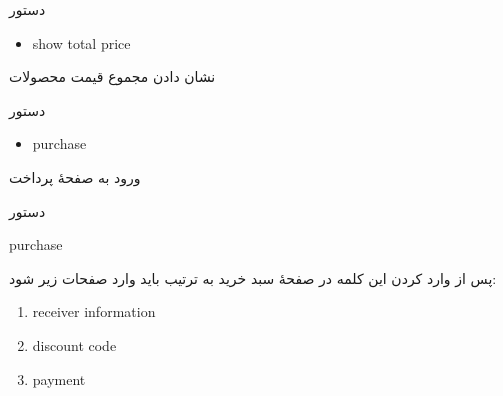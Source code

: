 \documentclass[]{article}
\begin{document}
\begin{mybox}[colback=brilliantlavender]{دستور}

\begin{latin}

\begin{itemize}[label = {$\Rightarrow$}]

\item
show total price

\end{itemize}

\end{latin}

\end{mybox}

نشان دادن مجموع قیمت محصولات


\begin{mybox}[colback=brilliantlavender]{دستور}

\begin{latin}

\begin{itemize}[label = {$\Rightarrow$}]

\item
purchase

\end{itemize}

\end{latin}

\end{mybox}

ورود به صفحهٔ پرداخت

\hrulefill

\begin{mybox}[colback=yellow]{دستور}

\begin{latin}

purchase

\end{latin}

\end{mybox}

پس از وارد کردن این کلمه در صفحهٔ سبد خرید به ترتیب باید وارد صفحات زیر شود:


\begin{latin}

\begin{enumerate}

\item
receiver information

\item
discount code

\item
payment


\end{enumerate}


\end{latin}
\end{document}

